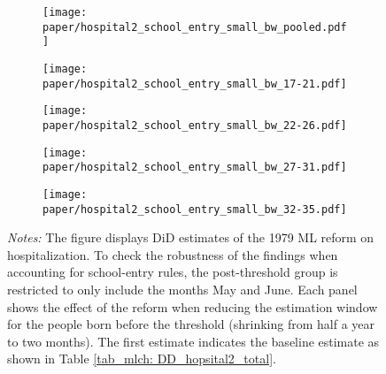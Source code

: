 \begin{figure}[t]\centering\caption{Robustness: Account for School Cutoff Rules for Hospitalization}\label{fig_mlch: school_cutoff_hospital}
	\begin{subfigure}[h]{0.48\linewidth}\centering
		\texttt{[image: paper/hospital2\_school\_entry\_small\_bw\_pooled.pdf]}
	\end{subfigure}
	
	\begin{subfigure}[h]{0.48\linewidth}\centering
		\texttt{[image: paper/hospital2\_school\_entry\_small\_bw\_17-21.pdf]}
	\end{subfigure}
	\begin{subfigure}[h]{0.48\linewidth}\centering
		\texttt{[image: paper/hospital2\_school\_entry\_small\_bw\_22-26.pdf]}
	\end{subfigure}
	\begin{subfigure}[h]{0.48\linewidth}\centering
		\texttt{[image: paper/hospital2\_school\_entry\_small\_bw\_27-31.pdf]}
	\end{subfigure}
	\begin{subfigure}[h]{0.48\linewidth}\centering
		\texttt{[image: paper/hospital2\_school\_entry\_small\_bw\_32-35.pdf]}
	\end{subfigure}
	\scriptsize
	\begin{minipage}{\linewidth}
		\emph{Notes:} The figure displays DiD estimates of the 1979 ML reform on hospitalization. To check the robustness of the findings when accounting for school-entry rules, the post-threshold group is restricted to only include the months May and June. Each panel shows the effect of the reform when reducing the estimation window for the people born before the threshold (shrinking from half a year to two months). The first estimate indicates the baseline estimate as shown in Table \ref{tab_mlch: DD_hopsital2_total}.
	\end{minipage}
\end{figure}

